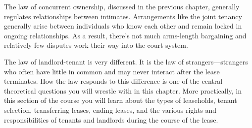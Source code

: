 The law of concurrent ownership, discussed in the previous chapter, generally
regulates relationships between intimates.  Arrangements like the joint tenancy
generally arise between individuals who know each other and remain locked in
ongoing relationships.  As a result, there's not much arms-length bargaining
and relatively few disputes work their way into the court system.

The law of landlord-tenant is very different.  It is the law of
strangers---strangers who often have little in common and may never interact
after the lease terminates.  How the law responds to this difference is one of
the central theoretical questions you will wrestle with in this chapter.  More
practically, in this section of the course you will learn about the types of
leaseholds, tenant selection, transferring leases, ending leases, and the
various rights and responsibilities of tenants and landlords during the course
of the lease.

